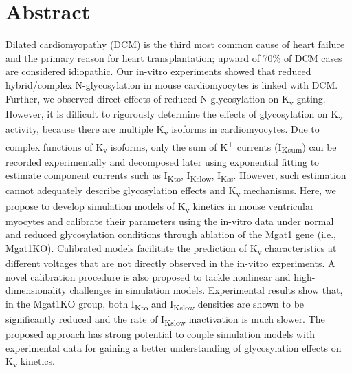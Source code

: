 \documentclass[10pt,letterpaper]{article}
\begin{document}
\section*{Abstract}
Dilated cardiomyopathy (DCM) is the third most common cause of heart failure and the primary reason for heart transplantation; upward of 70\% of DCM cases are considered idiopathic. Our in-vitro experiments showed that reduced hybrid/complex N-glycosylation in mouse cardiomyocytes is linked with DCM. Further, we observed direct effects of reduced N-glycosylation on K\textsubscript{v} gating. However, it is difficult to rigorously determine the effects of glycosylation on K\textsubscript{v} activity, because there are multiple K\textsubscript{v} isoforms in cardiomyocytes. Due to complex functions of K\textsubscript{v} isoforms, only the sum of K\textsuperscript{+} currents (I\textsubscript{Ksum}) can be recorded experimentally and decomposed later using exponential fitting to estimate component currents such as I\textsubscript{Kto}, I\textsubscript{Kslow}, I\textsubscript{Kss}. However, such estimation cannot adequately describe glycosylation effects and K\textsubscript{v} mechanisms. Here, we propose to develop simulation models of K\textsubscript{v} kinetics in mouse ventricular myocytes and calibrate their parameters using the in-vitro data under normal and reduced glycosylation conditions through ablation of the Mgat1 gene (i.e., Mgat1KO). Calibrated models facilitate the prediction of K\textsubscript{v} characteristics at different voltages that are not directly observed in the in-vitro experiments. A novel calibration procedure is also proposed to tackle nonlinear and high-dimensionality challenges in simulation models. Experimental results show that, in the Mgat1KO group, both I\textsubscript{Kto} and I\textsubscript{Kslow} densities are shown to be significantly reduced and the rate of I\textsubscript{Kslow} inactivation is much slower. The proposed approach has strong potential to couple simulation models with experimental data for gaining a better understanding of glycosylation effects on K\textsubscript{v} kinetics.

\end{document}
